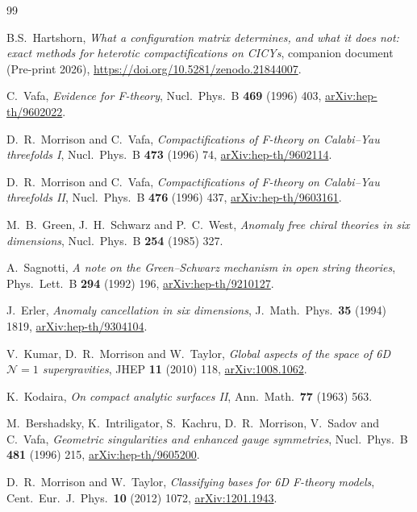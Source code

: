 \documentclass[11pt,a4paper]{article}
\theoremstyle{definition}
\begin{document}
\begin{thebibliography}{99}
\setlength{\itemsep}{1pt plus 0.5pt}

B.S.~Hartshorn,
\emph{What a configuration matrix determines, and what it does not: exact
methods for heterotic compactifications on CICYs},
companion document (Pre-print 2026),
\url{https://doi.org/10.5281/zenodo.21844007}.

C.~Vafa,
\emph{Evidence for F-theory},
Nucl.\ Phys.\ B \textbf{469} (1996) 403,
\href{https://arxiv.org/abs/hep-th/9602022}{arXiv:hep-th/9602022}.

D.~R.~Morrison and C.~Vafa,
\emph{Compactifications of F-theory on Calabi--Yau threefolds I},
Nucl.\ Phys.\ B \textbf{473} (1996) 74,
\href{https://arxiv.org/abs/hep-th/9602114}{arXiv:hep-th/9602114}.

D.~R.~Morrison and C.~Vafa,
\emph{Compactifications of F-theory on Calabi--Yau threefolds II},
Nucl.\ Phys.\ B \textbf{476} (1996) 437,
\href{https://arxiv.org/abs/hep-th/9603161}{arXiv:hep-th/9603161}.

M.~B.~Green, J.~H.~Schwarz and P.~C.~West,
\emph{Anomaly free chiral theories in six dimensions},
Nucl.\ Phys.\ B \textbf{254} (1985) 327.

A.~Sagnotti,
\emph{A note on the Green--Schwarz mechanism in open string theories},
Phys.\ Lett.\ B \textbf{294} (1992) 196,
\href{https://arxiv.org/abs/hep-th/9210127}{arXiv:hep-th/9210127}.

J.~Erler,
\emph{Anomaly cancellation in six dimensions},
J.\ Math.\ Phys.\ \textbf{35} (1994) 1819,
\href{https://arxiv.org/abs/hep-th/9304104}{arXiv:hep-th/9304104}.

V.~Kumar, D.~R.~Morrison and W.~Taylor,
\emph{Global aspects of the space of 6D $\mathcal{N}=1$ supergravities},
JHEP \textbf{11} (2010) 118,
\href{https://arxiv.org/abs/1008.1062}{arXiv:1008.1062}.

K.~Kodaira,
\emph{On compact analytic surfaces II},
Ann.\ Math.\ \textbf{77} (1963) 563.

M.~Bershadsky, K.~Intriligator, S.~Kachru, D.~R.~Morrison, V.~Sadov and
C.~Vafa,
\emph{Geometric singularities and enhanced gauge symmetries},
Nucl.\ Phys.\ B \textbf{481} (1996) 215,
\href{https://arxiv.org/abs/hep-th/9605200}{arXiv:hep-th/9605200}.


D.~R.~Morrison and W.~Taylor,
\emph{Classifying bases for 6D F-theory models},
Cent.\ Eur.\ J.\ Phys.\ \textbf{10} (2012) 1072,
\href{https://arxiv.org/abs/1201.1943}{arXiv:1201.1943}.


\end{thebibliography}
\end{document}
